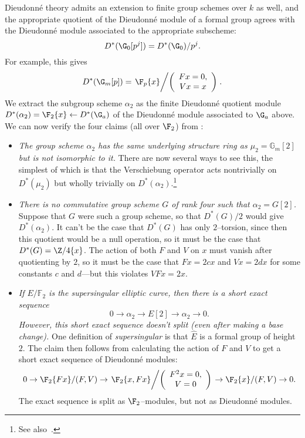 \begin{example}\label{WorkedAlpha2Example}
Dieudonn\'e theory admits an extension to finite group schemes over \(k\) as well, and the appropriate quotient of the Dieudonn\'e module of a formal group agrees with the Dieudonn\'e module associated to the appropriate subscheme: \[D^*(\G_0[p^j]) = D^*(\G_0) / p^j.\]  For example, this gives \[D^*(\G_m[p]) = \left.\F_p\{x\} \middle/\left(\begin{array}{c} Fx = 0, \\ Vx = x \end{array}\right)\right. .\]  We extract the subgroup scheme \(\alpha_2\) as the finite Dieudonn\'e quotient module \(D^*(\alpha_2) = \F_2\{x\} \leftarrow D^*(\G_a)\) of the Dieudonn\'e module associated to \(\G_a\) above.  We can now verify the four claims (all over \(\F_2\)) from :
\begin{itemize}
\item \textit{The group scheme \(\alpha_2\) has the same underlying structure ring as \(\mu_2 = \mathbb{G}_m[2]\) but is not isomorphic to it.}  There are now several ways to see this, the simplest of which is that the Verschiebung operator acts nontrivially on \(D^*(\mu_2)\) but wholly trivially on \(D^*(\alpha_2)\).\footnote{See also~\cite[Example 8.5]{StricklandFPFP}.}
\item \textit{There is no commutative group scheme \(G\) of rank four such that \(\alpha_2 = G[2]\).}  Suppose that \(G\) were such a group scheme, so that \(D^*(G) / 2\) would give \(D^*(\alpha_2)\).  It can't be the case that \(D^*(G)\) has only \(2\)--torsion, since then this quotient would be a null operation, so it must be the case that \(D^*(G) = \Z/4\{x\}\).  The action of both \(F\) and \(V\) on \(x\) must vanish after quotienting by \(2\), so it must be the case that \(Fx = 2cx\) and \(Vx = 2dx\) for some constants \(c\) and \(d\)---but this violates \(VFx = 2x\).
\item \textit{If \(E/\mathbb{F}_2\) is the supersingular elliptic curve, then there is a short exact sequence \[0 \rightarrow \alpha_2 \rightarrow E[2] \rightarrow \alpha_2 \rightarrow 0.\]  However, this short exact sequence doesn't split (even after making a base change).}  One definition of \textit{supersingular} is that \(\widehat E\) is a formal group of height \(2\).  The claim then follows from calculating the action of \(F\) and \(V\) to get a short exact sequence of Dieudonn\'e modules: \[0 \to \F_2\{Fx\}/(F, V) \to \left.\F_2\{x, Fx\} \middle/ \left( \begin{array}{c} F^2x = 0, \\ V = 0 \end{array}\right) \right. \to \F_2\{x\}/(F, V) \to 0.\]  The exact sequence is split as \(\F_2\)--modules, but not as Dieudonn\'e modules.

\end{itemize}
\end{example}
